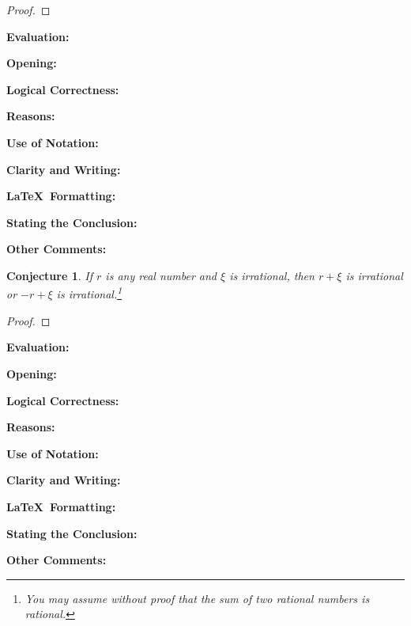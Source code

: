 \documentclass[11pt,titlepage]{article}		%
\def\rubric{\textbf{Evaluation:} \makebox[0.75in]{\hrulefill}

\vspace{.3in}

\textbf{Opening:} \makebox[0.75in]{\hrulefill}

\vspace{.3in}

\textbf{Logical Correctness:} \makebox[0.75in]{\hrulefill}

\vspace{.3in}

\textbf{Reasons:} \makebox[0.75in]{\hrulefill}

\vspace{.3in}

\textbf{Use of Notation:} \makebox[0.75in]{\hrulefill}

\vspace{.3in}

\textbf{Clarity and Writing:} \makebox[0.75in]{\hrulefill}

\vspace{.3in}

\textbf{\LaTeX\ Formatting:} \makebox[0.75in]{\hrulefill}

\vspace{.3in}

\textbf{Stating the Conclusion:} \makebox[0.75in]{\hrulefill}

\vspace{.3in}

\textbf{Other Comments:}

\vspace{1in}

}
\theoremstyle{theorem}
\newtheorem{conjecture}[theorem]{Conjecture}
\theoremstyle{definition}
\begin{document}
\begin{proof}

\end{proof}


\rubric


\clearpage

\begin{conjecture}
    If $r$ is any real number and $\xi$ is irrational, then $r + \xi$ is irrational or $-r + \xi$ is irrational.\footnote{You may assume without proof that the sum of two rational numbers is rational.}
\end{conjecture}

\begin{proof}

\end{proof}

\rubric
\end{document}
